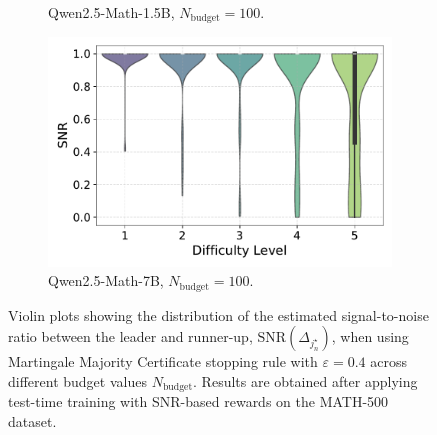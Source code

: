 \begin{figure}[h!]
\begin{subfigure}{0.49\textwidth}
        \caption{Qwen2.5-Math-1.5B, $N_{\text{budget}}=100$.}
      \label{fig:QWEN-MATH-1.5B_budget_100_SNR_04}
  \end{subfigure}
  \hfill
  \begin{subfigure}{0.49\textwidth}
      \centering
      \includegraphics[width=\textwidth]{figs/QWEN-MATH-7B_violin_maj100_SNR_04.pdf}
        \caption{Qwen2.5-Math-7B, $N_{\text{budget}}=100$.}
      \label{fig:QWEN-MATH-7B_budget_100_SNR_04}
  \end{subfigure}
  \caption{Violin plots showing the distribution of the estimated signal-to-noise ratio between the leader and runner-up, ${\text{SNR}}(\Delta_{j^\star_n})$, when using Martingale Majority Certificate stopping rule with $\varepsilon = 0.4$ across different budget values $N_{\text{budget}}$. Results are obtained after applying test-time training with SNR-based rewards on the MATH-500 dataset.}
  \label{fig:violin_plots_SNR_ground_truth_04}
\end{figure}
